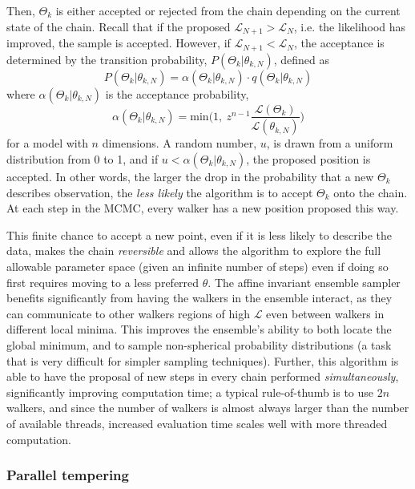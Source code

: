 Then, $\Theta_k$ is either accepted or rejected from the chain depending on the current state of the chain. Recall that if the proposed $\mathcal{L}_{N+1} > \mathcal{L}_{N}$, i.e. the likelihood has improved, the sample is accepted. However, if $\mathcal{L}_{N+1} < \mathcal{L}_{N}$, the acceptance is determined by the transition probability, $P(\Theta_k | \theta_{k,N})$, defined as
\begin{equation}
    P(\Theta_k | \theta_{k,N}) = \alpha(\Theta_k | \theta_{k,N}) \cdot q(\Theta_k | \theta_{k,N})
\end{equation}
where $\alpha(\Theta_k | \theta_{k,N})$ is the acceptance probability,
\begin{equation}
    \alpha(\Theta_k | \theta_{k,N}) = \mathrm{min}\bigg( 1,\ z^{n-1}\frac{\mathcal{L}(\Theta_k)}{\mathcal{L}(\theta_{k,N})} \bigg)
\end{equation}
for a model with $n$ dimensions.
A random number, $u$, is drawn from a uniform distribution from 0 to 1, and if $u < \alpha(\Theta_k | \theta_{k,N})$, the proposed position is accepted.
In other words, the larger the drop in the probability that a new $\Theta_k$ describes observation, the \textit{less likely} the algorithm is to accept $\Theta_k$ onto the chain.
At each step in the MCMC, every walker has a new position proposed this way.

This finite chance to accept a new point, even if it is less likely to describe the data, makes the chain \textit{reversible} and allows the algorithm to explore the full allowable parameter space (given an infinite number of steps) even if doing so first requires moving to a less preferred $\theta$.
The affine invariant ensemble sampler benefits significantly from having the walkers in the ensemble interact, as they can communicate to other walkers regions of high $\mathcal{L}$ even between walkers in different local minima.
This improves the ensemble's ability to both locate the global minimum, and to sample non-spherical probability distributions (a task that is very difficult for simpler sampling techniques).
Further, this algorithm is able to have the proposal of new steps in every chain performed \textit{simultaneously}, significantly improving computation time; a typical rule-of-thumb is to use $2n$ walkers, and since the number of walkers is almost always larger than the number of available threads, increased evaluation time scales well with more threaded computation.


\subsubsection{Parallel tempering}\label{sect:modelling:parallel tempering}

